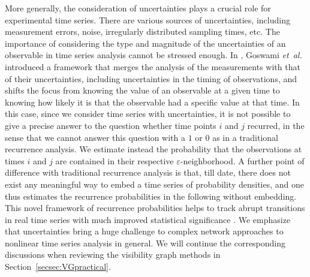 		More generally, the consideration of uncertainties plays a crucial role for experimental time series. There are various sources of uncertainties, including measurement errors, noise, irregularly distributed sampling times, etc. The importance of considering the type and magnitude of the uncertainties of an observable in time series analysis cannot be stressed enough. In \cite{Goswami2018}, Goswami {\textit{et~al.}} introduced a framework that merges the analysis of the measurements with that of their uncertainties, including uncertainties in the timing of observations, and shifts the focus from knowing the value of an observable at a given time to knowing how likely it is that the observable had a specific value at that time. In this case, since we consider time series with uncertainties, it is not possible to give a precise answer to the question whether time points $i$ and $j$ recurred, in the sense that we cannot answer this question with a $1$ or $0$ as in a traditional recurrence analysis. We estimate instead the probability that the observations at times $i$ and $j$ are contained in their respective $\varepsilon$-neighborhood. A further point of difference with traditional recurrence analysis is that, till date, there does not exist any meaningful way to embed a time series of probability densities, and one thus estimates the recurrence probabilities in the following without embedding. This novel framework of recurrence probabilities helps to track abrupt transitions in real time series with much improved statistical significance \cite{Goswami2018}. We emphasize that uncertainties bring a huge challenge to complex network approaches to nonlinear time series analysis in general. We will continue the corresponding discussions when reviewing the visibility graph methods in Section~\ref{secsec:VGpractical}.

